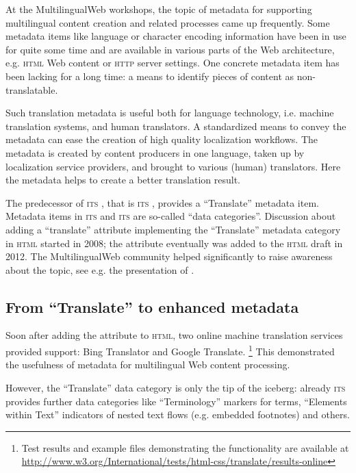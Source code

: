 \documentclass[output=paper]{LSP/langsci}
\begin{document}
At the MultilingualWeb workshops, the topic of metadata for supporting multilingual content creation and related processes came up frequently. Some metadata items like language or character encoding information have been in use for quite some time and are available in various parts of the Web architecture, e.g. \textsc{html} Web content or \textsc{http} server settings. One concrete metadata item has been lacking for a long time: a means to identify pieces of content as non-translatable.

Such translation metadata is useful both for language technology, i.e. machine translation systems, and human translators. A standardized means to convey the metadata can ease the creation of high quality localization workflows. The metadata is created by content producers in one language, taken up by localization service providers, and brought to various (human) translators. Here the metadata helps to create a better translation result.

The predecessor of \textsc{its }, that is \textsc{its }, provides a ``Translate'' metadata item. Metadata items in \textsc{its } and \textsc{its } are so-called ``data categories''. Discussion about adding a ``translate'' attribute implementing the ``Translate'' metadata category in \textsc{html} started in 2008; the attribute eventually was added to the \textsc{html} draft in 2012. The MultilingualWeb community helped significantly to raise awareness about the topic, see e.g. the presentation of \citet{Ishida2011}.

\subsection{From ``Translate'' to enhanced metadata}\label{sec:sasaki:2.3}
\largerpage
Soon after adding the attribute to \textsc{html}, two online machine translation services provided support: Bing Translator and Google Translate. \footnote{Test results and example files demonstrating the functionality are available at \url{http://www.w3.org/International/tests/html-css/translate/results-online}} This demonstrated the usefulness of metadata for multilingual Web content processing.

However, the ``Translate'' data category is only the tip of the iceberg: already \textsc{its } provides further data categories like ``Terminology'' markers for terms, ``Elements within Text'' indicators of nested text flows (e.g. embedded footnotes) and others. 
\end{document}
